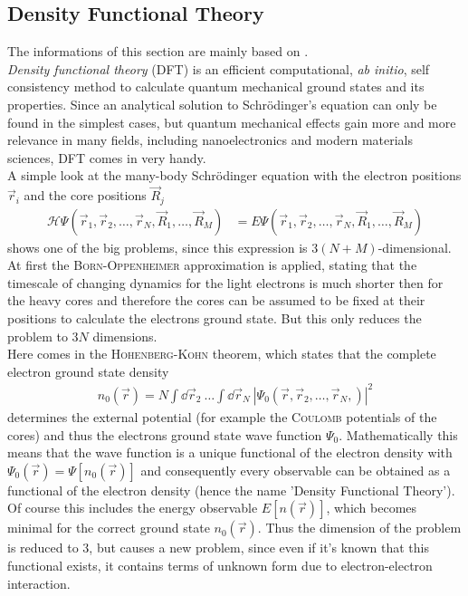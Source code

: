 \subsection{Density Functional Theory}
The informations of this section are mainly based on \cite{KOSKINEN2009237,1402-4896-2004-T109-001}.\\
\emph{Density functional theory} (DFT) is an efficient computational, \emph{ab initio}, self consistency method to calculate quantum mechanical ground states and its properties. Since an analytical solution to Schrödinger's equation can only be found in the simplest cases, but quantum mechanical effects gain more and more relevance in many fields, including nanoelectronics and modern materials sciences, DFT comes in very handy.\\
A simple look at the many-body Schrödinger equation with the electron positions $\vec{r}_i$ and the core positions $\vec{R}_j$
\begin{align}
	\mathcal{H} \Psi\left(\vec{r}_1,\vec{r}_2,\dots,\vec{r}_N,\vec{R}_1,\dots,\vec{R}_M\right) &= E \Psi\left(\vec{r}_1,\vec{r}_2,\dots,\vec{r}_N,\vec{R}_1,\dots,\vec{R}_M\right)
\end{align}
shows one of the big problems, since this expression is $3(N+M)$-dimensional.
At first the \textsc{Born-Oppenheimer} approximation is applied, stating that the timescale of changing dynamics for the light electrons is much shorter then for the heavy cores and therefore the cores can be assumed to be fixed at their positions to calculate the electrons ground state. But this only reduces the problem to $3N$ dimensions.\\
Here comes in the \textsc{Hohenberg-Kohn} theorem, which states that the complete electron ground state density
\begin{align}
n_0\left(\vec{r}\right) = N\int\dd\vec{r}_2\ \dots\int\dd\vec{r}_N\ \left|\Psi_0\left(\vec{r}, \vec{r}_2, \dots,\vec{r}_N,\right)\right|^2
\end{align}
determines the external potential (for example the \textsc{Coulomb} potentials of the cores) and thus the electrons ground state wave function $\Psi_0$. Mathematically this means that the wave function is a unique functional of the electron density with $\Psi_0\left(\vec{r}\right) = \Psi\left[n_0\left(\vec{r}\right)\right]$ and consequently every observable can be obtained as a functional of the electron density (hence the name 'Density Functional Theory').\\
Of course this includes the energy observable $E[n\left(\vec{r}\right)]$, which becomes minimal for the correct ground state $n_0\left(\vec{r}\right)$. Thus the dimension of the problem is reduced to $3$, but causes a new problem, since even if it's known that this functional exists, it contains terms of unknown form due to electron-electron interaction.\\
